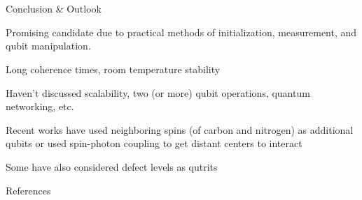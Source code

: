 \documentclass[11pt]{beamer}
\begin{document}
\section*{ }
\begin{frame}{Conclusion \& Outlook}

Promising candidate due to practical methods of initialization, measurement, and qubit manipulation. 

\medskip\pause

Long coherence times, room temperature stability

\medskip\pause

Haven't discussed scalability, two (or more) qubit operations, quantum networking, etc.

\medskip\pause

Recent works have used neighboring spins (of carbon and nitrogen) as additional qubits \cite{PhysRevX.9.031045} or used spin-photon coupling to get distant centers to interact \cite{nemoto2016photonic}

\medskip\pause

Some have also considered defect levels as qutrits \cite{PhysRevLett.129.100501}

\end{frame}

\begin{frame}[allowframebreaks]{References}


 

\end{frame}
\end{document}
